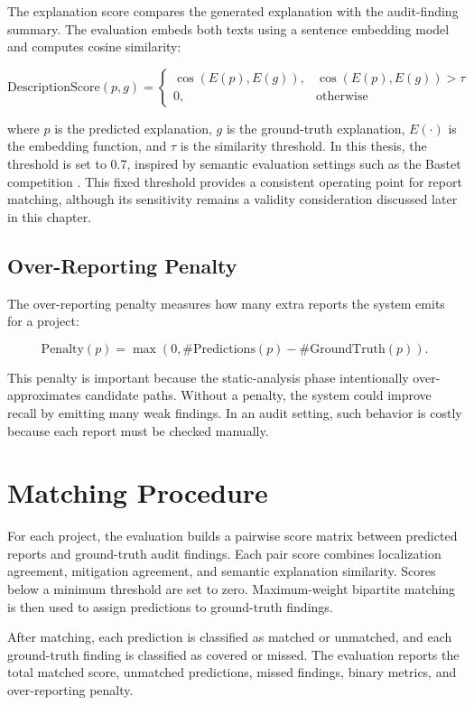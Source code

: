 The explanation score compares the generated explanation with the audit-finding
summary. The evaluation embeds both texts using a sentence embedding model and
computes cosine similarity:

\[
\mathrm{DescriptionScore}(p, g) =
\begin{cases}
\cos(E(p), E(g)), & \cos(E(p), E(g)) > \tau \\
0, & \text{otherwise}
\end{cases}
\]

where $p$ is the predicted explanation, $g$ is the ground-truth explanation,
$E(\cdot)$ is the embedding function, and $\tau$ is the similarity threshold.
In this thesis, the threshold is set to 0.7, inspired by semantic evaluation
settings such as the Bastet competition \citep{bastet}. This fixed threshold
provides a consistent operating point for report matching, although its
sensitivity remains a validity consideration discussed later in this chapter.

\subsection{Over-Reporting Penalty}

The over-reporting penalty measures how many extra reports the system emits for
a project:

\[
\mathrm{Penalty}(p) =
\max(0, \#\mathrm{Predictions}(p) - \#\mathrm{GroundTruth}(p)).
\]

This penalty is important because the static-analysis phase intentionally
over-approximates candidate paths. Without a penalty, the system could improve
recall by emitting many weak findings. In an audit setting, such behavior is
costly because each report must be checked manually.

\section{Matching Procedure}

For each project, the evaluation builds a pairwise score matrix between
predicted reports and ground-truth audit findings. Each pair score combines
localization agreement, mitigation agreement, and semantic explanation
similarity. Scores below a minimum threshold are set to zero. Maximum-weight
bipartite matching is then used to assign predictions to ground-truth findings.

After matching, each prediction is classified as matched or unmatched, and each
ground-truth finding is classified as covered or missed. The evaluation reports
the total matched score, unmatched predictions, missed findings, binary metrics,
and over-reporting penalty.

